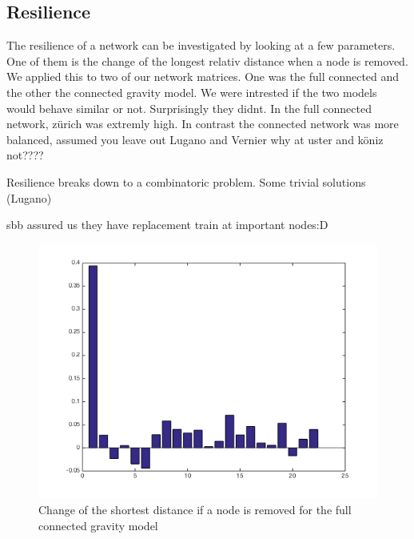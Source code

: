 \documentclass[11pt]{article}
\begin{document}
\subsection{Resilience}

The resilience of a network can be investigated by looking at a few parameters. One of them is the change of the longest relativ distance when a node is removed. We applied this to two of our network matrices. One was the full connected and the other the connected gravity model. We were intrested if the two models would behave similar or not. Surprisingly they didnt. In the full connected network, zürich was extremly high. In contrast the connected network was more balanced, assumed you leave out Lugano and Vernier why at uster and köniz not????

Resilience breaks down to a combinatoric problem. Some trivial solutions (Lugano)
 
 sbb assured us they have replacement train at important nodes:D

\begin{figure}
\includegraphics[scale=0.5]{fullConnedtedShortestNetworkDistanceChange}
 \caption{Change of the shortest distance if a node is removed for the full connected gravity model}
\end{figure}
\end{document}
